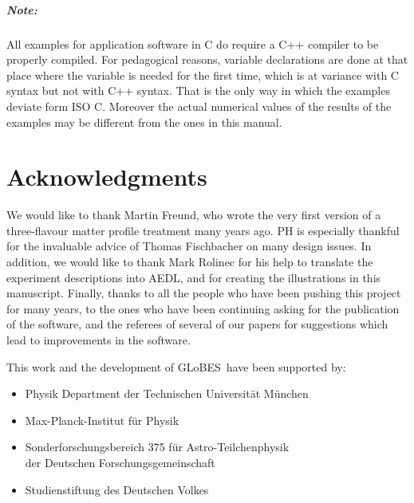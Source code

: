 \documentclass[a4paper,12pt,twoside]{book}
\newcommand{\GLOBES}{{\sf GLoBES}}
\newcommand{\AEDL}{{\sf AEDL}}
\begin{document}
\paragraph{Note:} All examples for application software in C do require
a C++ compiler to be properly compiled. For pedagogical reasons, variable
declarations are done at that place where the variable is needed for the
first time, which is at variance with C syntax but not with C++ syntax.
That is the only way in which the examples deviate form ISO C. Moreover
the actual numerical values of the results of the examples may be different
from the ones in this manual. 

\mainmatter










\backmatter
\chapter*{Acknowledgments}

We would like to thank Martin Freund, who wrote the very first
version of a three-flavour matter profile treatment many years ago.
PH is especially thankful for the invaluable advice of Thomas Fischbacher on
many design issues. 
In addition, we would like to thank
Mark Rolinec for his help to translate the experiment descriptions
into \AEDL, and for creating the illustrations in this manuscript.
Finally, thanks to all the people who have been pushing this project
for many years, to the ones who have been continuing asking for the 
publication of the software, and the referees of several of our
papers for suggestions which lead to improvements in the software.


This work and the development of \GLOBES\ have been supported by:
\begin{itemize}
\item Physik Department der Technischen Universit\"at M\"unchen
\item Max-Planck-Institut f\"ur Physik 
\item Sonderforschungsbereich 375 f\"ur Astro-Teilchenphysik\\ 
der Deutschen Forschungsgemeinschaft
\item Studienstiftung des Deutschen Volkes 
\end{itemize}
\end{document}
